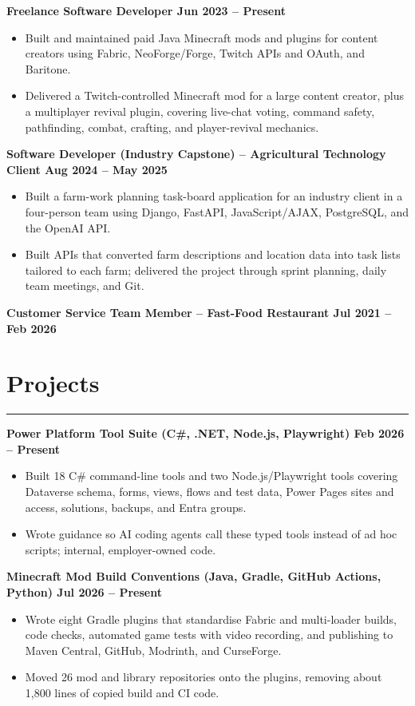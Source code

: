 \documentclass[10pt,a4paper]{article}
\newcommand{\ressection}[1]{%
  \section*{#1}%
  \vspace{-12pt}%
  \noindent\rule{\textwidth}{0.4pt}%
  \vspace{0pt}%
}
\begin{document}
\textbf{Freelance Software Developer \hfill Jun 2023 -- Present}
\begin{itemize}
      \item Built and maintained paid Java Minecraft mods and plugins for content creators using Fabric, NeoForge/Forge, Twitch APIs and OAuth, and Baritone.
      \item Delivered a Twitch-controlled Minecraft mod for a large content creator, plus a multiplayer revival plugin, covering live-chat voting, command safety, pathfinding, combat, crafting, and player-revival mechanics.
\end{itemize}

\textbf{Software Developer (Industry Capstone) -- Agricultural Technology Client \hfill Aug 2024 -- May 2025}
\begin{itemize}
      \item Built a farm-work planning task-board application for an industry client in a four-person team using Django, FastAPI, JavaScript/AJAX, PostgreSQL, and the OpenAI API.
      \item Built APIs that converted farm descriptions and location data into task lists tailored to each farm; delivered the project through sprint planning, daily team meetings, and Git.
\end{itemize}

\textbf{Customer Service Team Member -- Fast-Food Restaurant \hfill Jul 2021 -- Feb 2026}

\ressection{Projects}

\textbf{Power Platform Tool Suite (C\#, .NET, Node.js, Playwright) \hfill Feb 2026 -- Present}
\begin{itemize}
      \item Built 18 C\# command-line tools and two Node.js/Playwright tools covering Dataverse schema, forms, views, flows and test data, Power Pages sites and access, solutions, backups, and Entra groups.
      \item Wrote guidance so AI coding agents call these typed tools instead of ad hoc scripts; internal, employer-owned code.
\end{itemize}

\textbf{Minecraft Mod Build Conventions (Java, Gradle, GitHub Actions, Python) \hfill Jul 2026 -- Present}
\begin{itemize}
      \item Wrote eight Gradle plugins that standardise Fabric and multi-loader builds, code checks, automated game tests with video recording, and publishing to Maven Central, GitHub, Modrinth, and CurseForge.
      \item Moved 26 mod and library repositories onto the plugins, removing about 1,800 lines of copied build and CI code.
\end{itemize}
\end{document}
